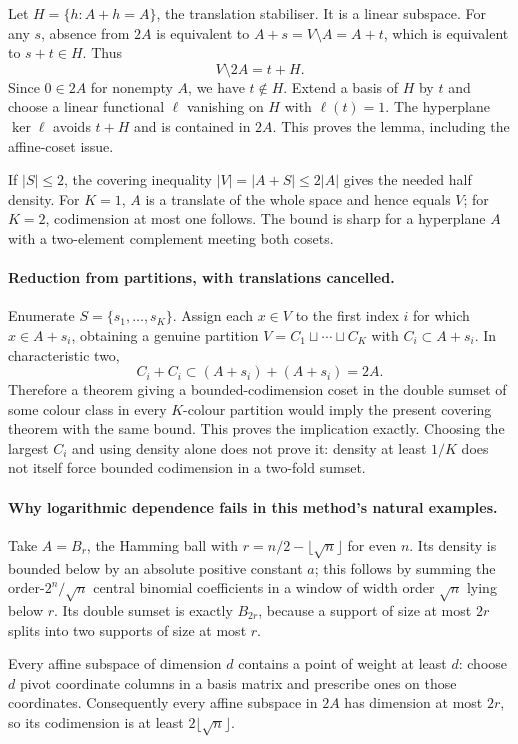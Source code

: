 \documentclass[11pt,a4paper]{article}
\begin{document}
Let $H=\{h:A+h=A\}$, the translation stabiliser. It is a linear subspace. For any $s$, absence from $2A$ is equivalent to $A+s=V\setminus A=A+t$, which is equivalent to $s+t\in H$. Thus
\[
 V\setminus2A=t+H.
\]
Since $0\in2A$ for nonempty $A$, we have $t\notin H$. Extend a basis of $H$ by $t$ and choose a linear functional $\ell$ vanishing on $H$ with $\ell(t)=1$. The hyperplane $\ker\ell$ avoids $t+H$ and is contained in $2A$. This proves the lemma, including the affine-coset issue.

If $|S|\leq2$, the covering inequality $|V|=|A+S|\leq2|A|$ gives the needed half density. For $K=1$, $A$ is a translate of the whole space and hence equals $V$; for $K=2$, codimension at most one follows. The bound is sharp for a hyperplane $A$ with a two-element complement meeting both cosets.

\paragraph{Reduction from partitions, with translations cancelled.}
Enumerate $S=\{s_1,\ldots,s_K\}$. Assign each $x\in V$ to the first index $i$ for which $x\in A+s_i$, obtaining a genuine partition $V=C_1\sqcup\cdots\sqcup C_K$ with $C_i\subset A+s_i$. In characteristic two,
\[
 C_i+C_i\subset(A+s_i)+(A+s_i)=2A.
\]
Therefore a theorem giving a bounded-codimension coset in the double sumset of some colour class in every $K$-colour partition would imply the present covering theorem with the same bound. This proves the implication exactly. Choosing the largest $C_i$ and using density alone does not prove it: density at least $1/K$ does not itself force bounded codimension in a two-fold sumset.

\paragraph{Why logarithmic dependence fails in this method's natural examples.}
Take $A=B_r$, the Hamming ball with $r=n/2-\lfloor\sqrt n\rfloor$ for even $n$. Its density is bounded below by an absolute positive constant $a$; this follows by summing the order-$2^n/\sqrt n$ central binomial coefficients in a window of width order $\sqrt n$ lying below $r$. Its double sumset is exactly $B_{2r}$, because a support of size at most $2r$ splits into two supports of size at most $r$.

Every affine subspace of dimension $d$ contains a point of weight at least $d$: choose $d$ pivot coordinate columns in a basis matrix and prescribe ones on those coordinates. Consequently every affine subspace in $2A$ has dimension at most $2r$, so its codimension is at least $2\lfloor\sqrt n\rfloor$.
\end{document}
